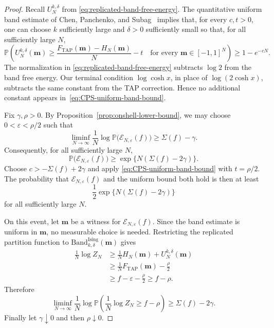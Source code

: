 \documentclass[a4paper,10pt,reqno]{amsart}
\numberwithin{equation}{section}
\newcommand{\ve}{\varepsilon}
\newcommand{\dP}{\mathbb{P}}%
\newcommand{\Ising}{\mathrm{Ising}}
\newcommand{\mc}{\mathcal}
\newcommand{\TAP}{\mathrm{TAP}}
\newcommand{\Band}{\mathrm{Band}}
\newcommand{\bfm}{\mathbf{m}}
\begin{document}
	\begin{proof}
		Recall \(U_N^{k,\delta}\) from
		\eqref{eq:replicated-band-free-energy}. The quantitative uniform band
		estimate of Chen, Panchenko, and
		Subag~\cite[Theorem~1]{ChenPanchenkoSubag} implies that, for every
		\(c,t>0\), one can choose \(k\) sufficiently large and \(\delta>0\)
		sufficiently small so that, for all sufficiently large \(N\),
		\begin{equation}\label{eq:CPS-uniform-band-bound}
			\dP\left(
			U_N^{k,\delta}(\bfm)
			\ge
			\frac{F_{\TAP}(\bfm)-H_N(\bfm)}N-t
			\quad\text{for every }\bfm\in[-1,1]^N
			\right)
			\ge1-e^{-cN}.
		\end{equation}
		The normalization in \eqref{eq:replicated-band-free-energy} subtracts
		\(\log2\) from the band free energy. Our terminal condition
		\(\log\cosh x\), in place of \(\log(2\cosh x)\), subtracts the same
		constant from the TAP correction. Hence no additional constant appears
		in~\eqref{eq:CPS-uniform-band-bound}.
		
		Fix \(\gamma,\rho>0\). By Proposition~\ref{prop:onshell-lower-bound},
		we may choose
		\(0<\ve<\rho/2\) such that
		\[
		\liminf_{N\to\infty}\frac1N
		\log\dP\bigl(\mc E_{N,\ve}(f)\bigr)
		\ge\Sigma(f)-\gamma.
		\]
		Consequently, for all sufficiently large \(N\),
		\[
		\dP\bigl(\mc E_{N,\ve}(f)\bigr)
		\ge \exp\bigl\{N(\Sigma(f)-2\gamma)\bigr\}.
		\]
		Choose \(c>-\Sigma(f)+2\gamma\) and apply
		\eqref{eq:CPS-uniform-band-bound} with \(t=\rho/2\). The probability
		that \(\mc E_{N,\ve}(f)\) and the uniform bound both hold is then at
		least
		\[
		\frac12
		\exp\bigl\{N(\Sigma(f)-2\gamma)\bigr\}
		\]
		for all sufficiently large \(N\).
		
		On this event, let \(\bfm\) be a witness for
		\(\mc E_{N,\ve}(f)\). Since the band estimate is uniform in \(\bfm\),
		no measurable choice is needed. Restricting the replicated partition
		function to \(\Band_{k,\delta}^{\Ising}(\bfm)\) gives
		\begin{align*}
			\frac1N\log Z_N
			&\ge
			\frac1N H_N(\bfm)+U_N^{k,\delta}(\bfm)\\
			&\ge
			\frac1N F_{\TAP}(\bfm)-\frac\rho2\\
			&\ge f-\ve-\frac\rho2
			\ge f-\rho.
		\end{align*}
		Therefore
		\[
		\liminf_{N\to\infty}\frac1N\log\dP\left(
		\frac1N\log Z_N\ge f-\rho
		\right)
		\ge\Sigma(f)-2\gamma.
		\]
		Finally let \(\gamma\downarrow0\) and then \(\rho\downarrow0\).
	\end{proof}
	
\end{document}
